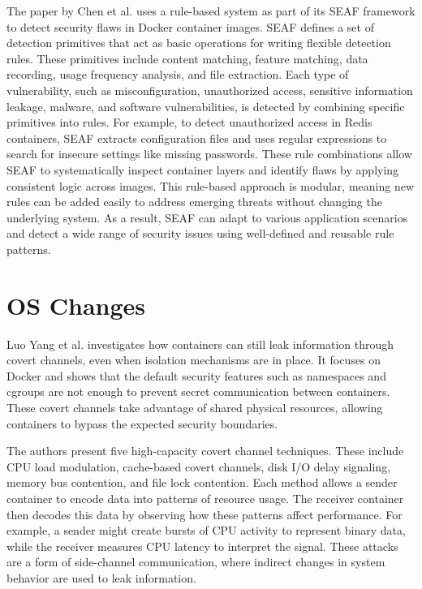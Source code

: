 \begin{doublespace}
The paper by Chen et al. \cite{chen2022seaf} uses a rule-based system as part of its SEAF framework to detect security flaws in Docker container images. SEAF defines a set of detection primitives that act as basic operations for writing flexible detection rules. These primitives include content matching, feature matching, data recording, usage frequency analysis, and file extraction. Each type of vulnerability, such as misconfiguration, unauthorized access, sensitive information leakage, malware, and software vulnerabilities, is detected by combining specific primitives into rules. For example, to detect unauthorized access in Redis containers, SEAF extracts configuration files and uses regular expressions to search for insecure settings like missing passwords. These rule combinations allow SEAF to systematically inspect container layers and identify flaws by applying consistent logic across images. This rule-based approach is modular, meaning new rules can be added easily to address emerging threats without changing the underlying system. As a result, SEAF can adapt to various application scenarios and detect a wide range of security issues using well-defined and reusable rule patterns.

\section{OS Changes}

Luo Yang et al. \cite{luo2016whispers} investigates how containers can still leak information through covert channels, even when isolation mechanisms are in place. It focuses on Docker and shows that the default security features such as namespaces and cgroups are not enough to prevent secret communication between containers. These covert channels take advantage of shared physical resources, allowing containers to bypass the expected security boundaries.

The authors present five high-capacity covert channel techniques. These include CPU load modulation, cache-based covert channels, disk I/O delay signaling, memory bus contention, and file lock contention. Each method allows a sender container to encode data into patterns of resource usage. The receiver container then decodes this data by observing how these patterns affect performance. For example, a sender might create bursts of CPU activity to represent binary data, while the receiver measures CPU latency to interpret the signal. These attacks are a form of side-channel communication, where indirect changes in system behavior are used to leak information.


\end{doublespace}
